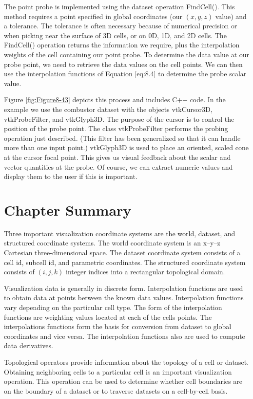 The point probe is implemented using the dataset operation FindCell(). This method requires a point specified in global coordinates (our $(x,y,z)$ value) and a tolerance. The tolerance is often necessary because of numerical precision or when picking near the surface of 3D cells, or on 0D, 1D, and 2D cells. The FindCell() operation returns the information we require, plus the interpolation weights of the cell containing our point probe. To determine the data value at our probe point, we need to retrieve the data values on the cell points. We can then use the interpolation functions of Equation \ref{eq:8.4} to determine the probe scalar value.

Figure \ref{fig:Figure8-43} depicts this process and includes C++ code. In the example we use the combustor dataset with the objects vtkCursor3D, vtkProbeFilter, and vtkGlyph3D. The purpose of the cursor is to control the position of the probe point. The class vtkProbeFilter performs the probing  operation just described. (This filter has been generalized so that it can handle more than one input point.) vtkGlyph3D is used to place an oriented, scaled cone at the cursor focal point. This gives us visual feedback about the scalar and vector quantities at the probe. Of course, we can extract numeric values and display them to the user if this is important.

\section{Chapter Summary}

Three important visualization coordinate systems are the world, dataset, and structured coordinate systems. The world coordinate system is an x--y--z Cartesian three-dimensional space. The dataset coordinate system consists of a cell id, subcell id, and parametric coordinates. The structured coordinate system consists of $(i,j,k)$ integer indices into a rectangular topological domain.

Visualization data is generally in discrete form. Interpolation functions are used to obtain data at points between the known data values. Interpolation functions vary depending on the particular cell type. The form of the interpolation functions are weighting values located at each of the cells points. The interpolations functions form the basis for conversion from dataset to global coordinates and vice versa. The interpolation functions also are used to compute data derivatives.

Topological operators provide information about the topology of a cell or dataset. Obtaining neighboring cells to a particular cell is an important visualization operation. This operation can be used to determine whether cell boundaries are on the boundary of a dataset or to traverse datasets on a cell-by-cell basis.

